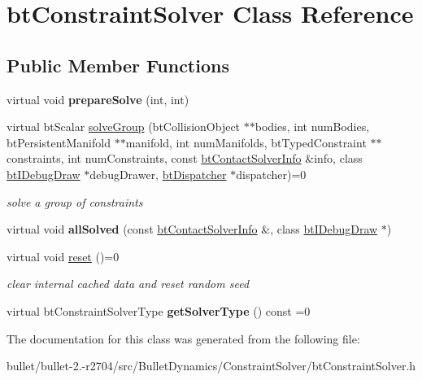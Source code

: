 \hypertarget{classbt_constraint_solver}{\section{bt\+Constraint\+Solver Class Reference}
\label{classbt_constraint_solver}
}
\subsection*{Public Member Functions}
\begin{DoxyCompactItemize}
\item 
\hypertarget{classbt_constraint_solver_a90ff1d9f2d3fa9228c69cd695a3d5682}{virtual void {\bfseries prepare\+Solve} (int, int)}\label{classbt_constraint_solver_a90ff1d9f2d3fa9228c69cd695a3d5682}

\item 
\hypertarget{classbt_constraint_solver_a923b7573a8d62805714abd5157dd0963}{virtual bt\+Scalar \hyperlink{classbt_constraint_solver_a923b7573a8d62805714abd5157dd0963}{solve\+Group} (bt\+Collision\+Object $\ast$$\ast$bodies, int num\+Bodies, bt\+Persistent\+Manifold $\ast$$\ast$manifold, int num\+Manifolds, bt\+Typed\+Constraint $\ast$$\ast$constraints, int num\+Constraints, const \hyperlink{structbt_contact_solver_info}{bt\+Contact\+Solver\+Info} \&info, class \hyperlink{classbt_i_debug_draw}{bt\+I\+Debug\+Draw} $\ast$debug\+Drawer, \hyperlink{classbt_dispatcher}{bt\+Dispatcher} $\ast$dispatcher)=0}\label{classbt_constraint_solver_a923b7573a8d62805714abd5157dd0963}

\begin{DoxyCompactList}\small\item\em solve a group of constraints \end{DoxyCompactList}\item 
\hypertarget{classbt_constraint_solver_a5bdefc71a1f24bdfb997515db8c2548e}{virtual void {\bfseries all\+Solved} (const \hyperlink{structbt_contact_solver_info}{bt\+Contact\+Solver\+Info} \&, class \hyperlink{classbt_i_debug_draw}{bt\+I\+Debug\+Draw} $\ast$)}\label{classbt_constraint_solver_a5bdefc71a1f24bdfb997515db8c2548e}

\item 
\hypertarget{classbt_constraint_solver_aefecf97d956c5f1ad16a8b00b2f36aa9}{virtual void \hyperlink{classbt_constraint_solver_aefecf97d956c5f1ad16a8b00b2f36aa9}{reset} ()=0}\label{classbt_constraint_solver_aefecf97d956c5f1ad16a8b00b2f36aa9}

\begin{DoxyCompactList}\small\item\em clear internal cached data and reset random seed \end{DoxyCompactList}\item 
\hypertarget{classbt_constraint_solver_a33094c1dd86c576d89a97292bc8bc904}{virtual bt\+Constraint\+Solver\+Type {\bfseries get\+Solver\+Type} () const =0}\label{classbt_constraint_solver_a33094c1dd86c576d89a97292bc8bc904}

\end{DoxyCompactItemize}


The documentation for this class was generated from the following file\+:\begin{DoxyCompactItemize}
\item 
bullet/bullet-\/2.-\/r2704/src/\+Bullet\+Dynamics/\+Constraint\+Solver/bt\+Constraint\+Solver.\+h\end{DoxyCompactItemize}
